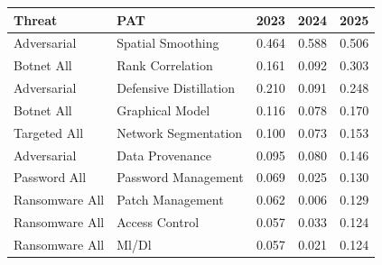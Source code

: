 \begin{tabular}{llrrr}
\toprule
Threat & PAT & 2023 & 2024 & 2025 \\
\midrule
Adversarial & Spatial Smoothing & 0.464 & 0.588 & 0.506 \\
Botnet All & Rank Correlation & 0.161 & 0.092 & 0.303 \\
Adversarial & Defensive Distillation & 0.210 & 0.091 & 0.248 \\
Botnet All & Graphical Model & 0.116 & 0.078 & 0.170 \\
Targeted  All & Network Segmentation & 0.100 & 0.073 & 0.153 \\
Adversarial & Data Provenance & 0.095 & 0.080 & 0.146 \\
Password  All & Password Management & 0.069 & 0.025 & 0.130 \\
Ransomware All & Patch Management & 0.062 & 0.006 & 0.129 \\
Ransomware All & Access Control & 0.057 & 0.033 & 0.124 \\
Ransomware All & Ml/Dl & 0.057 & 0.021 & 0.124 \\
\bottomrule
\end{tabular}
